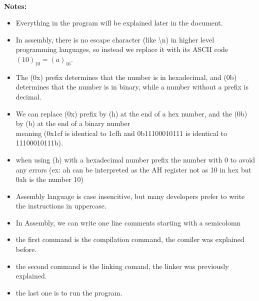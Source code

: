 \documentclass[10pt]{article}
\begin{document}
    \\\textbf{Notes: }\begin{itemize}
        \item Everything in the program will be explained later in the document.
        \item In assembly, there is no escape character (like \textbackslash n) in higher level programming languages, so instead we replace it with its ASCII code $(10)_{10} = (a)_{16}$.
        \item The (0x) prefix determines that the number is in hexadecimal, and (0b) determines that the number is in binary, while a number without a prefix is decimal.
        \item We can replace (0x) prefix by (h) at the end of a hex number, and the (0b) by (b) at the end of a binary number\\
        meaning (0x1cf is identical to 1cfh and 0b11100010111 is identical to 11100010111b).
        \item when using (h) with a hexadecimal number prefix the number with 0 to avoid any errors (ex: ah can be interpreted as the AH register not as 10 in hex but 0ah is the number 10)
        \item Assembly language is case insencitive, but many developers prefer to write the instructions in uppercase.
        \item In Assembly, we can write one line comments starting with a semicolomn
        \item the first command is the compilation command, the comiler was explained before.
        \item the second command is the linking comand, the linker was previously explained.
        \item the last one is to run the program.
    \end{itemize}
    
\end{document}
